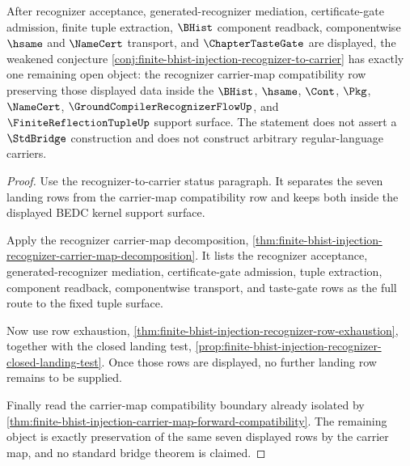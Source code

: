 \begin{theorem}
\label{thm:finite-bhist-injection-recognizer-carrier-map-row-closure}
After recognizer acceptance, generated-recognizer mediation, certificate-gate admission, finite tuple extraction, $\BHist$ component readback, componentwise $\hsame$ and $\NameCert$ transport, and $\ChapterTasteGate$ are displayed, the weakened conjecture \autoref{conj:finite-bhist-injection-recognizer-to-carrier} has exactly one remaining open object: the recognizer carrier-map compatibility row preserving those displayed data inside the $\BHist$, $\hsame$, $\Cont$, $\Pkg$, $\NameCert$, $\GroundCompilerRecognizerFlowUp$, and $\FiniteReflectionTupleUp$ support surface. The statement does not assert a $\StdBridge$ construction and does not construct arbitrary regular-language carriers.
\end{theorem}
\begin{proof}
Use the recognizer-to-carrier status paragraph. It separates the seven landing rows from the carrier-map compatibility row and keeps both inside the displayed BEDC kernel support surface.

Apply the recognizer carrier-map decomposition, \autoref{thm:finite-bhist-injection-recognizer-carrier-map-decomposition}. It lists the recognizer acceptance, generated-recognizer mediation, certificate-gate admission, tuple extraction, component readback, componentwise transport, and taste-gate rows as the full route to the fixed tuple surface.

Now use row exhaustion, \autoref{thm:finite-bhist-injection-recognizer-row-exhaustion}, together with the closed landing test, \autoref{prop:finite-bhist-injection-recognizer-closed-landing-test}. Once those rows are displayed, no further landing row remains to be supplied.

Finally read the carrier-map compatibility boundary already isolated by \autoref{thm:finite-bhist-injection-carrier-map-forward-compatibility}. The remaining object is exactly preservation of the same seven displayed rows by the carrier map, and no standard bridge theorem is claimed.
\end{proof}

